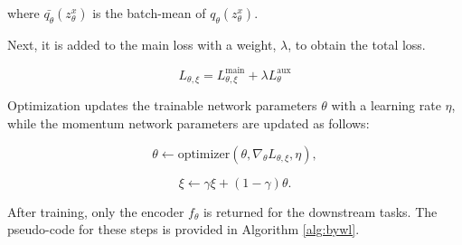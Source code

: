 where $\bar{q_{\theta}}(z_{\theta}^{x})$ is the batch-mean of ${q_{\theta}}(z_{\theta}^{x})$.


Next, it is added to the main loss with a weight, $\lambda$, to obtain the total loss.

\begin{equation}
L_{\theta, \xi} = L_{\theta, \xi}^{\text{main}} + \lambda L_{\theta}^{\text{aux}}
\end{equation}


Optimization updates the trainable network parameters $\theta$ with a learning rate $\eta$, while the momentum network parameters are updated as follows:

\begin{equation}
\theta \leftarrow \text{optimizer}(\theta, \nabla_{\theta} L_{\theta, \xi}, \eta),
\end{equation}

\begin{equation}
\xi \leftarrow \gamma \xi + (1 - \gamma) \theta.
\end{equation}

After training, only the encoder $f_{\theta}$ is returned for the downstream tasks. The pseudo-code for these steps is provided in Algorithm \ref{alg:bywl}.

